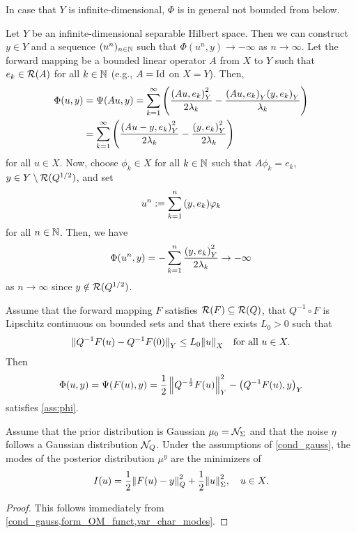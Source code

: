 \documentclass[english]{jnsao}
\theoremstyle{definition}
\begin{document}
In case that $Y$ is infinite-dimensional, $\Phi$ is in general not bounded from below.
\begin{example}
\label{ex:gauss_unbounded}
Let $Y$ be an infinite-dimensional separable Hilbert space. Then we can construct $y \in Y$ and a sequence $(u^n)_{n\in\mathbb{N}}$ such that $\Phi(u^n,y) \to -\infty$ as $n \to \infty$. Let the forward mapping be a bounded linear operator $A$ from $X$ to $Y$ such that $e_k \in \operatorname{\mathcal{R}}(A)$ for all $k \in \mathbb{N}$ (e.g., $A = \operatorname{Id}$ on $X = Y$). Then,
\begin{align*}
\Phi(u,y) &= \Psi(Au,y) = \sum_{k=1}^\infty \left( \frac{{(Au,e_k)}_Y^2}{2\lambda_k} - \frac{{(Au,e_k)}_Y{(y,e_k)}_Y}{\lambda_k} \right) \\
&= \sum_{k=1}^\infty \left( \frac{{(Au - y,e_k)}_Y^2}{2\lambda_k} - \frac{{(y,e_k)}_Y^2}{2\lambda_k} \right)
\end{align*}
for all $u \in X$. Now, choose $\phi_k \in X$ for all $k \in \mathbb{N}$ such that $A\phi_k = e_k$, $y \in Y \setminus \operatorname{\mathcal{R}}(Q^{1/2})$, and set
\[ u^n := \sum_{k=1}^n {(y,e_k)}\varphi_k \]
for all $n \in \mathbb{N}$. Then, we have
\begin{equation*}
\Phi(u^n,y) = -\sum_{k=1}^n \frac{{(y,e_k)}_Y^2}{2\lambda_k} \to -\infty
\end{equation*}
as $n \to \infty$ since $y \notin \operatorname{\mathcal{R}}(Q^{1/2})$.
\end{example}

\begin{lemma}
	\label{cond_gauss}
	Assume that the forward mapping $F$ satisfies $\operatorname{\mathcal{R}}(F) \subseteq \operatorname{\mathcal{R}}(Q)$, that $Q^{-1} \circ F$ is Lipschitz continuous on bounded sets and that there exists $L_0 > 0$ such that
	\begin{equation}
		\label{Lip0_cond}
		{\lVert Q^{-1}F(u) - Q^{-1}F(0)\rVert}_Y \le L_0 {\lVert u\rVert}_X \quad \text{for all}~u \in X.
	\end{equation}
	Then
	\[ \Phi(u,y) = \Psi(F(u),y) = \frac12\left\lVert Q^{-\frac12}F(u)\right\rVert_Y^2 - \left(Q^{-1}F(u),y\right)_Y \]
	satisfies \cref{ass:phi}.
\end{lemma}

\begin{corollary}
	Assume that the prior distribution is Gaussian $\mu_0 = \mathcal{N}_\Sigma$ and that the noise $\eta$ follows a Gaussian distribution $\mathcal{N}_Q$.
	Under the assumptions of \cref{cond_gauss}, the modes of the posterior distribution $\mu^y$ are the minimizers of
	\[ I(u) = \frac12{\lVert F(u) - y\rVert}_Q^2 + \frac12{\lVert u\rVert}_\Sigma^2, \quad u \in X. \]
\end{corollary}
\begin{proof}
	This follows immediately from \cref{cond_gauss,form_OM_funct,var_char_modes}.
\end{proof}
\end{document}
